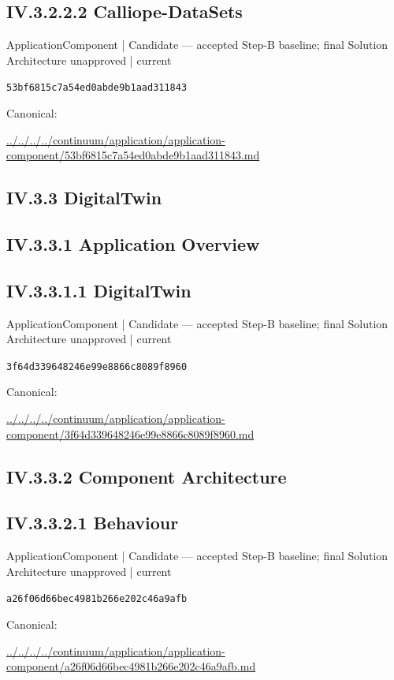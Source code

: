 \documentclass[10pt,a4paper]{article}
\begin{document}
\subsection*{IV.3.2.2.2 Calliope-DataSets}
{\small ApplicationComponent | Candidate — accepted Step-B baseline; final Solution Architecture unapproved | current}\par
\texttt{53bf6815c7a54ed0abde9b1aad311843}\par
Canonical: \par
{\footnotesize\url{../../../../continuum/application/application-component/53bf6815c7a54ed0abde9b1aad311843.md}}\par
\subsection*{IV.3.3 DigitalTwin}
\subsection*{IV.3.3.1 Application Overview}
\subsection*{IV.3.3.1.1 DigitalTwin}
{\small ApplicationComponent | Candidate — accepted Step-B baseline; final Solution Architecture unapproved | current}\par
\texttt{3f64d339648246e99e8866c8089f8960}\par
Canonical: \par
{\footnotesize\url{../../../../continuum/application/application-component/3f64d339648246e99e8866c8089f8960.md}}\par
\subsection*{IV.3.3.2 Component Architecture}
\subsection*{IV.3.3.2.1 Behaviour}
{\small ApplicationComponent | Candidate — accepted Step-B baseline; final Solution Architecture unapproved | current}\par
\texttt{a26f06d66bec4981b266e202c46a9afb}\par
Canonical: \par
{\footnotesize\url{../../../../continuum/application/application-component/a26f06d66bec4981b266e202c46a9afb.md}}\par
\end{document}
